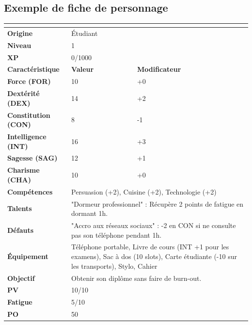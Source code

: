 \documentclass[11pt, a4paper]{article}
\begin{document}
\subsection{Exemple de fiche de personnage}
\begin{center}
    \begin{tabular}{|>{\bfseries}l|l|l|}
        \hline
        \multicolumn{3}{|c|}{\textbf{Fiche de Personnage : Jean-Michel}}  	\\
        \hline
        \textbf{Origine} & \multicolumn{2}{|l|}{Étudiant}  	\\
        \hline
        \textbf{Niveau} & \multicolumn{2}{|l|}{1}  	\\
        \hline
        \textbf{XP} & \multicolumn{2}{|l|}{0/1000}  	\\
        \hline
        \textbf{Caractéristique} & \textbf{Valeur} & \textbf{Modificateur}  	\\
        \hline
        Force (FOR) & 10 & +0  	\\
        Dextérité (DEX) & 14 & +2  	\\
        Constitution (CON) & 8 & -1  	\\
        Intelligence (INT) & 16 & +3  	\\
        Sagesse (SAG) & 12 & +1  	\\
        Charisme (CHA) & 10 & +0  	\\
        \hline
        \textbf{Compétences} & \multicolumn{2}{|l|}{Persuasion (+2), Cuisine (+2), Technologie (+2)}  	\\
        \hline
        \textbf{Talents} & \multicolumn{2}{|l|}{"Dormeur professionnel" : Récupère 2 points de fatigue en dormant 1h.}  	\\
        \hline
        \textbf{Défauts} & \multicolumn{2}{|l|}{"Accro aux réseaux sociaux" : -2 en CON si ne consulte pas son téléphone pendant 1h.}  	\\
        \hline
        \textbf{Équipement} & \multicolumn{2}{|l|}{Téléphone portable, Livre de cours (INT +1 pour les examens), Sac à dos (10 slots), Carte étudiante (-10 sur les transports), Stylo, Cahier}  	\\
        \hline
        \textbf{Objectif} & \multicolumn{2}{|l|}{Obtenir son diplôme sans faire de burn-out.}  	\\
        \hline
        \textbf{PV} & \multicolumn{2}{|l|}{10/10}  	\\
        \hline
        \textbf{Fatigue} & \multicolumn{2}{|l|}{5/10}  	\\
        \hline
        \textbf{PO} & \multicolumn{2}{|l|}{50}  	\\
        \hline
    \end{tabular}
\end{center}
\end{document}
